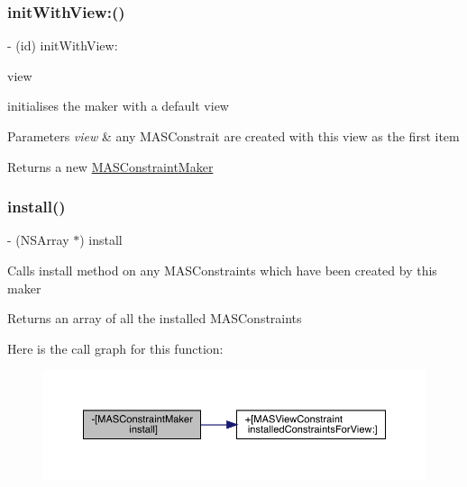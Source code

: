 \subsubsection{\texorpdfstring{init\+With\+View\+:()}{initWithView:()}}
{\footnotesize\ttfamily -\/ (id) init\+With\+View\+: \begin{DoxyParamCaption}\item[{(M\+A\+S\+\_\+\+V\+I\+EW $\ast$)}]{view }\end{DoxyParamCaption}}

initialises the maker with a default view


\begin{DoxyParams}{Parameters}
{\em view} & any M\+A\+S\+Constrait are created with this view as the first item\\
\hline
\end{DoxyParams}
\begin{DoxyReturn}{Returns}
a new \mbox{\hyperlink{interface_m_a_s_constraint_maker}{M\+A\+S\+Constraint\+Maker}} 
\end{DoxyReturn}
\mbox{\label{interface_m_a_s_constraint_maker_a6863abaf3c1136f48ffcd32315f95479}} 
\subsubsection{\texorpdfstring{install()}{install()}}
{\footnotesize\ttfamily -\/ (N\+S\+Array $\ast$) install \begin{DoxyParamCaption}{ }\end{DoxyParamCaption}}

Calls install method on any M\+A\+S\+Constraints which have been created by this maker

\begin{DoxyReturn}{Returns}
an array of all the installed M\+A\+S\+Constraints 
\end{DoxyReturn}
Here is the call graph for this function\+:\nopagebreak
\begin{figure}[H]
\begin{center}
\leavevmode
\includegraphics[width=350pt]{interface_m_a_s_constraint_maker_a6863abaf3c1136f48ffcd32315f95479_cgraph}
\end{center}
\end{figure}


